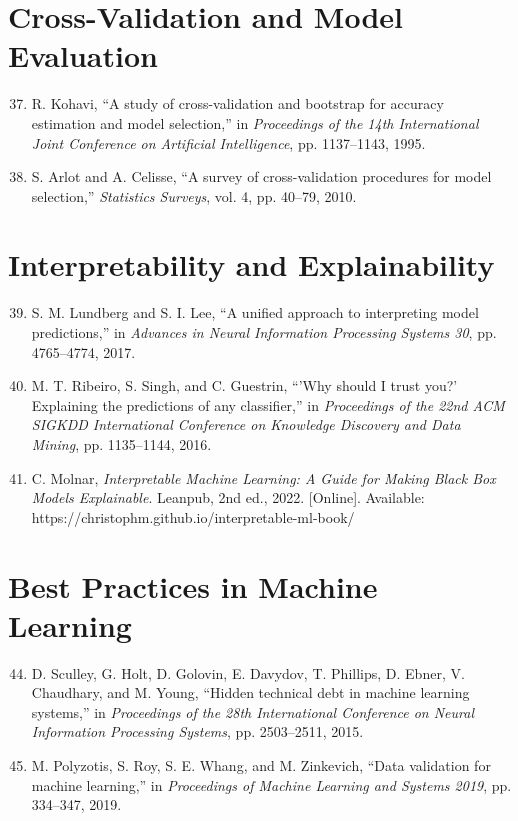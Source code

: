 \section*{Cross-Validation and Model Evaluation}

\begin{enumerate}
  \setcounter{enumi}{36}
  \item R. Kohavi, ``A study of cross-validation and bootstrap for accuracy estimation and model selection,'' in \textit{Proceedings of the 14th International Joint Conference on Artificial Intelligence}, pp. 1137--1143, 1995.
  
  \item S. Arlot and A. Celisse, ``A survey of cross-validation procedures for model selection,'' \textit{Statistics Surveys}, vol. 4, pp. 40--79, 2010.
\end{enumerate}

\section*{Interpretability and Explainability}

\begin{enumerate}
  \setcounter{enumi}{38}
  \item S. M. Lundberg and S. I. Lee, ``A unified approach to interpreting model predictions,'' in \textit{Advances in Neural Information Processing Systems 30}, pp. 4765--4774, 2017.
  
  \item M. T. Ribeiro, S. Singh, and C. Guestrin, ``'Why should I trust you?' Explaining the predictions of any classifier,'' in \textit{Proceedings of the 22nd ACM SIGKDD International Conference on Knowledge Discovery and Data Mining}, pp. 1135--1144, 2016.
  
  \item C. Molnar, \textit{Interpretable Machine Learning: A Guide for Making Black Box Models Explainable}. Leanpub, 2nd ed., 2022. [Online]. Available: https://christophm.github.io/interpretable-ml-book/
\end{enumerate}

\section*{Best Practices in Machine Learning}

\begin{enumerate}
  \setcounter{enumi}{43}
  \item D. Sculley, G. Holt, D. Golovin, E. Davydov, T. Phillips, D. Ebner, V. Chaudhary, and M. Young, ``Hidden technical debt in machine learning systems,'' in \textit{Proceedings of the 28th International Conference on Neural Information Processing Systems}, pp. 2503--2511, 2015.
  
  \item M. Polyzotis, S. Roy, S. E. Whang, and M. Zinkevich, ``Data validation for machine learning,'' in \textit{Proceedings of Machine Learning and Systems 2019}, pp. 334--347, 2019.
\end{enumerate}


